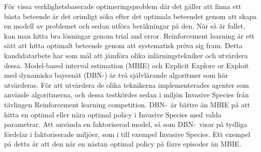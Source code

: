 För vissa verklighetsbaserade optimeringsproblem där det gäller att finna ett bästa beteende är det orimligt söka efter det optimala beteendet genom att skapa en modell av problemet och sedan utföra beräkningar på den. När så är fallet, kan man hitta bra lösningar genom trial and error. Reinforcement learning är ett sätt att hitta optimalt beteende genom att systematisk pröva sig fram.
Detta kandidatarbete har som mål att jämföra olika inlärningstekniker och utvärdera dessa.
Model-based interval estimation (MBIE) och Explicit Explore or Exploit med dynamiska bayesnät (DBN-\etre) är 
två självlärande algoritmer som här utvärderas.
För att utvärdera de olika teknikerna implementerades agenter som använde algoritmerna, och dessa testkördes sedan 
i miljön Invasive Species från tävlingen Reinforcement learning competition.
DBN-\etre\ är bättre än MBIE på att hitta en optimal eller nära optimal policy i Invasive Species med valda parametrar.
Att använda en faktoriserad model, så som DBN-\etre\, visar på tydliga fördelar i faktoriserade miljöer, som i till exempel Invasive Species. 
Ett exempel på detta är att den når en nästan optimal policy på färre episoder än MBIE.





